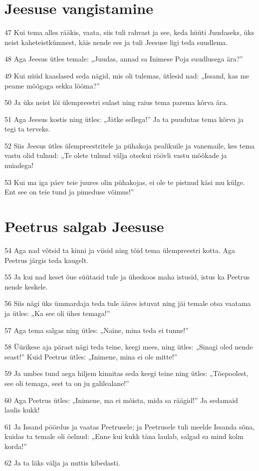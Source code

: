 \section*{Jeesuse vangistamine}

\par 47 Kui tema alles rääkis, vaata, siis tuli rahvast ja see, keda hüüti Juudaseks, üks neist kaheteistkümnest, käis nende ees ja tuli Jeesuse ligi teda suudlema.
\par 48 Aga Jeesus ütles temale: „Juudas, annad sa Inimese Poja suudlusega ära?”
\par 49 Kui nüüd kaaslased seda nägid, mis oli tulemas, ütlesid nad: „Issand, kas me peame mõõgaga sekka lööma?”
\par 50 Ja üks neist lõi ülempreestri sulast ning raius tema parema kõrva ära.
\par 51 Aga Jeesus kostis ning ütles: „Jätke sellega!” Ja ta puudutas tema kõrva ja tegi ta terveks.
\par 52 Siis Jeesus ütles ülempreestritele ja pühakoja pealikuile ja vanemaile, kes tema vastu olid tulnud: „Te olete tulnud välja otsekui röövli vastu mõõkade ja nuiadega!
\par 53 Kui ma iga päev teie juures olin pühakojas, ei ole te pistnud käsi mu külge. Ent see on teie tund ja pimeduse võimus!”

\section*{Peetrus salgab Jeesuse}

\par 54 Aga nad võtsid ta kinni ja viisid ning tõid tema ülempreestri kotta. Aga Peetrus järgis teda kaugelt.
\par 55 Ja kui nad keset õue süütasid tule ja üheskoos maha istusid, istus ka Peetrus nende keskele.
\par 56 Siis nägi üks ümmardaja teda tule ääres istuvat ning jäi temale otsa vaatama ja ütles: „Ka see oli ühes temaga!”
\par 57 Aga tema salgas ning ütles: „Naine, mina teda ei tunne!”
\par 58 Üürikese aja pärast nägi teda teine, keegi mees, ning ütles: „Sinagi oled nende seast!” Kuid Peetrus ütles: „Inimene, mina ei ole mitte!”
\par 59 Ja umbes tund aega hiljem kinnitas seda keegi teine ning ütles: „Tõepoolest, see oli temaga, sest ta on ju galilealane!”
\par 60 Aga Peetrus ütles: „Inimene, ma ei mõista, mida sa räägid!” Ja sedamaid laulis kukk!
\par 61 Ja Issand pöördus ja vaatas Peetrusele; ja Peetrusele tuli meelde Issanda sõna, kuidas ta temale oli öelnud: „Enne kui kukk täna laulab, salgad sa mind kolm korda!”
\par 62 Ja ta läks välja ja nuttis kibedasti.

